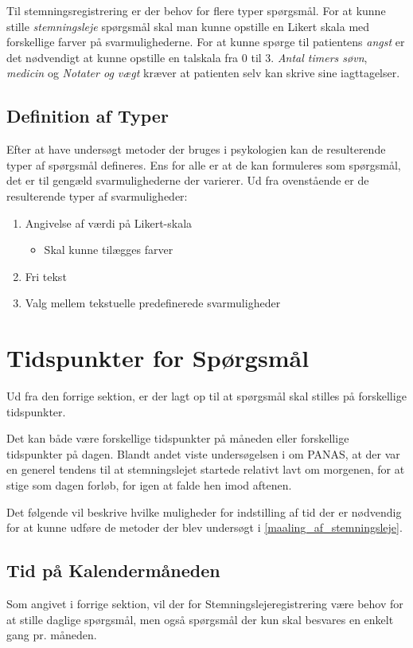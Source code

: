 Til stemningsregistrering er der behov for flere typer spørgsmål.
For at kunne stille \emph{stemningsleje} spørgsmål skal man kunne opstille en Likert skala med forskellige farver på svarmulighederne.
For at kunne spørge til patientens \emph{angst} er det nødvendigt at kunne opstille en talskala fra 0 til 3.
\emph{Antal timers søvn}, \emph{medicin} og \emph{Notater og vægt} kræver at patienten selv kan skrive sine iagttagelser.

\subsection{Definition af Typer}\label{krav::typer}
Efter at have undersøgt metoder der bruges i psykologien kan de resulterende typer af spørgsmål defineres.
Ens for alle er at de kan formuleres som spørgsmål, det er til gengæld svarmulighederne der varierer.
Ud fra ovenstående er de resulterende typer af svarmuligheder:

\begin{enumerate}
\item Angivelse af værdi på Likert-skala
\begin{itemize}
\item Skal kunne tilægges farver
\end{itemize}
\item Fri tekst
\item Valg mellem tekstuelle predefinerede svarmuligheder
\end{enumerate}

\section{Tidspunkter for Spørgsmål}
Ud fra den forrige sektion, er der lagt op til at spørgsmål skal stilles på forskellige tidspunkter.

Det kan både være forskellige tidspunkter på måneden eller forskellige tidspunkter på dagen.
Blandt andet viste undersøgelsen i \citet{panas} om PANAS, at der var en generel tendens til at stemningslejet startede relativt lavt om morgenen, for at stige som dagen forløb, for igen at falde hen imod aftenen.

Det følgende vil beskrive hvilke muligheder for indstilling af tid der er nødvendig for at kunne udføre de metoder der blev undersøgt i \cref{maaling_af_stemningsleje}.

\subsection{Tid på Kalendermåneden}
Som angivet i forrige sektion, vil der for Stemningslejeregistrering være behov for at stille daglige spørgsmål, men også spørgsmål der kun skal besvares en enkelt gang pr. måneden.

